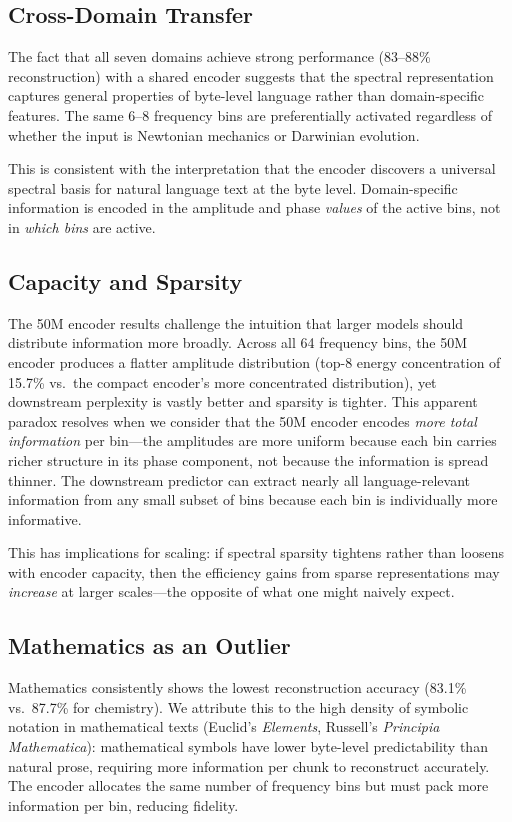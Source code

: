 \documentclass[10pt,twocolumn]{article}
\begin{document}
\subsection{Cross-Domain Transfer}

The fact that all seven domains achieve strong performance (83--88\% reconstruction) with a shared encoder suggests that the spectral representation captures general properties of byte-level language rather than domain-specific features. The same 6--8 frequency bins are preferentially activated regardless of whether the input is Newtonian mechanics or Darwinian evolution.

This is consistent with the interpretation that the encoder discovers a universal spectral basis for natural language text at the byte level. Domain-specific information is encoded in the amplitude and phase \emph{values} of the active bins, not in \emph{which bins} are active.

\subsection{Capacity and Sparsity}

The 50M encoder results challenge the intuition that larger models should distribute information more broadly. Across all 64 frequency bins, the 50M encoder produces a flatter amplitude distribution (top-8 energy concentration of 15.7\% vs.\ the compact encoder's more concentrated distribution), yet downstream perplexity is vastly better and sparsity is tighter. This apparent paradox resolves when we consider that the 50M encoder encodes \emph{more total information} per bin---the amplitudes are more uniform because each bin carries richer structure in its phase component, not because the information is spread thinner. The downstream predictor can extract nearly all language-relevant information from any small subset of bins because each bin is individually more informative.

This has implications for scaling: if spectral sparsity tightens rather than loosens with encoder capacity, then the efficiency gains from sparse representations may \emph{increase} at larger scales---the opposite of what one might naively expect.

\subsection{Mathematics as an Outlier}

Mathematics consistently shows the lowest reconstruction accuracy (83.1\% vs.\ 87.7\% for chemistry). We attribute this to the high density of symbolic notation in mathematical texts (Euclid's \emph{Elements}, Russell's \emph{Principia Mathematica}): mathematical symbols have lower byte-level predictability than natural prose, requiring more information per chunk to reconstruct accurately. The encoder allocates the same number of frequency bins but must pack more information per bin, reducing fidelity.
\end{document}
